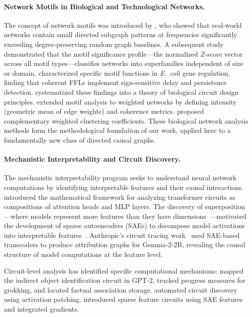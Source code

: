 \documentclass[11pt,letterpaper]{article}
\begin{document}
\paragraph{Network Motifs in Biological and Technological Networks.}
The concept of network motifs was introduced by \citet{Milo2002}, who showed that real-world networks contain small directed subgraph patterns at frequencies significantly exceeding degree-preserving random graph baselines. A subsequent study~\citep{Milo2004} demonstrated that the motif significance profile---the normalized $Z$-score vector across all motif types---classifies networks into superfamilies independent of size or domain. \citet{ShenOrr2002} characterized specific motif functions in \emph{E.~coli} gene regulation, finding that coherent FFLs implement sign-sensitive delay and persistence detection. \citet{Alon2007} systematized these findings into a theory of biological circuit design principles. \citet{Onnela2005} extended motif analysis to weighted networks by defining intensity (geometric mean of edge weights) and coherence metrics. \citet{Saramaki2007} proposed complementary weighted clustering coefficients. These biological network analysis methods form the methodological foundation of our work, applied here to a fundamentally new class of directed causal graphs.

\paragraph{Mechanistic Interpretability and Circuit Discovery.}
The mechanistic interpretability program seeks to understand neural network computations by identifying interpretable features and their causal interactions. \citet{Elhage2021} introduced the mathematical framework for analyzing transformer circuits as compositions of attention heads and MLP layers. The discovery of superposition---where models represent more features than they have dimensions~\citep{Elhage2022}---motivated the development of sparse autoencoders (SAEs) to decompose model activations into interpretable features~\citep{Bricken2023, Cunningham2024, Templeton2024}. Anthropic's circuit tracing work~\citep{Anthropic2025} used SAE-based transcoders to produce attribution graphs for Gemma-2-2B, revealing the causal structure of model computations at the feature level.

Circuit-level analysis has identified specific computational mechanisms: \citet{Wang2023} mapped the indirect object identification circuit in GPT-2, \citet{Nanda2023} tracked progress measures for grokking, and \citet{Meng2022} located factual association storage. \citet{Conmy2023} automated circuit discovery using activation patching. \citet{Marks2024} introduced sparse feature circuits using SAE features and integrated gradients.
\end{document}
